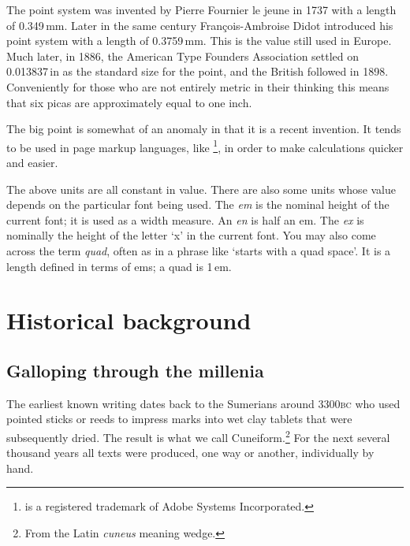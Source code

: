 \documentclass[10pt,letterpaper,extrafontsizes]{memoir}
\newcommand{\PWnote}[2]{}
\newcommand\U[2]{\textrm{#1}\,\textrm{#2}}
\begin{document}
    The point system was invented by Pierre Fournier le jeune in 1737 with
a length of \U{0.349}{mm}. Later in the same century Fran\c{c}ois-Ambroise Didot
introduced his point system with a length of \U{0.3759}{mm}. This is the value
still used in Europe. Much later, in 1886, the American Type Founders
Association settled on \U{0.013837}{in} as the standard size for the point, and
the British followed in 1898. Conveniently for those who are not entirely
metric in their thinking this means that 
six picas are approximately equal to one inch.

    The big point 
is somewhat of an anomaly in that it is a recent
invention. It tends to be used
in page markup languages, like \pscript\footnote{\pscript{} is a 
registered trademark of Adobe Systems Incorporated.\label{fn:ps}},
in order to make calculations quicker and easier.

    The above units are all constant in value. There are also some units
whose value depends on the particular font being used. 
The \textit{em}
is the nominal height of the current font; it is used as a width measure.
An \textit{en} is half an em.
The \textit{ex} is
nominally the height of the letter `x' in the current font. You may also
come across the term \textit{quad}, often as in a phrase
like `starts with a quad space'. It is a length defined in terms of
ems; a quad is \U{1}{em}.


\cleardoublepage

\mainmatter



\PWnote{2009/02/02}{Added Historical background chapter}
\chapter{Historical background} \label{chap:history}

\section{Galloping through the millenia}

    The earliest known writing dates back to the Sumerians around 3300\textsc{bc}
who used pointed sticks or reeds to impress marks into wet clay tablets
that were subsequently dried. The result is what we call 
Cuneiform.\footnote{From the Latin \emph{cuneus} meaning wedge.}
For the next several thousand years all texts were produced, one way or 
another, individually by hand.
\end{document}
